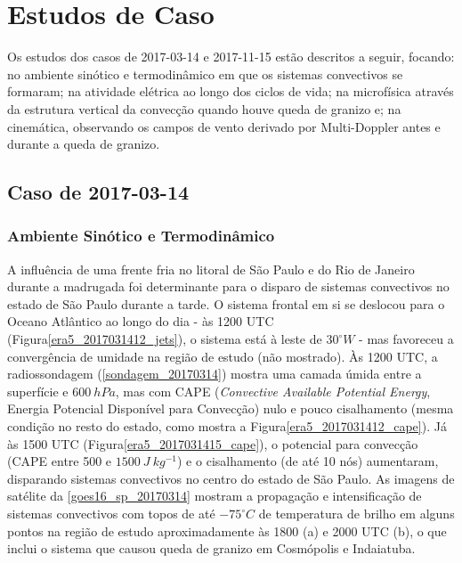\section{Estudos de Caso}\label{estudo_casos}

Os estudos dos casos de 2017-03-14 e 2017-11-15 estão descritos a seguir, focando: no ambiente sinótico e termodinâmico em que os sistemas convectivos se formaram; na atividade elétrica ao longo dos ciclos de vida; na microfísica através da estrutura vertical da convecção quando houve queda de granizo e; na cinemática, observando os campos de vento derivado por Multi-Doppler antes e durante a queda de granizo.

\subsection{Caso de 2017-03-14}

\subsubsection{Ambiente Sinótico e Termodinâmico}\label{sinotica_201703014}

A influência de uma frente fria no litoral de São Paulo e do Rio de Janeiro durante a madrugada foi determinante para o disparo de sistemas convectivos no estado de São Paulo durante a tarde. O sistema frontal em si se deslocou para o Oceano Atlântico ao longo do dia - às 1200 UTC (Figura\autoref{era5_2017031412_jets}), o sistema está à leste de $30^{\circ}W$ - mas favoreceu a convergência de umidade na região de estudo (não mostrado). Às 1200 UTC, a radiossondagem (\autoref{sondagem_20170314}) mostra uma camada úmida entre a superfície e $600\:hPa$, mas com CAPE (\textit{Convective Available Potential Energy}, Energia Potencial Disponível para Convecção) nulo e pouco cisalhamento (mesma condição no resto do estado, como mostra a Figura\autoref{era5_2017031412_cape}). Já às 1500 UTC (Figura\autoref{era5_2017031415_cape}), o potencial para convecção (CAPE entre 500 e $1500\:J\:kg^{-1}$) e o cisalhamento (de até 10 nós) aumentaram, disparando sistemas convectivos no centro do estado de São Paulo. As imagens de satélite da \autoref{goes16_sp_20170314} mostram a propagação e intensificação de sistemas convectivos com topos de até $-75^{\circ}C$ de temperatura de brilho em alguns pontos na região de estudo aproximadamente às 1800 (a) e 2000 UTC (b), o que inclui o sistema que causou queda de granizo em Cosmópolis e Indaiatuba. 

